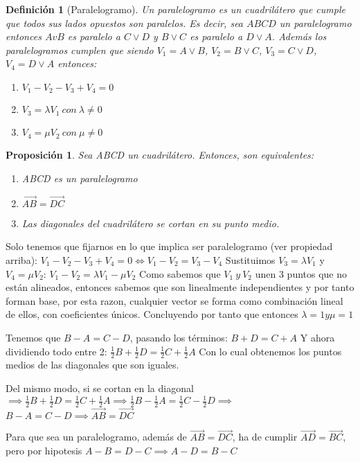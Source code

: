 \documentclass[11pt, a4paper, titlepage]{article}
\makeatletter
\renewenvironment{proof}[1][\proofname] {\vspace{-15pt}\par\pushQED{\qed}\normalfont\topsep6\p@\@plus6\p@\relax\trivlist\item[\hskip\labelsep\it#1\@addpunct{.}]\ignorespaces}{\popQED\endtrivlist\@endpefalse}
\theoremstyle{theorem-style}
\newtheorem*{nprop}{Proposición}
\theoremstyle{definition-style}
\newtheorem*{ndef}{Definición}
\theoremstyle{remark-style}
\theoremstyle{example-style}
\newenvironment{nlist}
{\begin{enumerate}
\renewcommand\labelenumi{(\emph{\roman{enumi})}}}
{\end{enumerate}}
\makeatother
\begin{document}
\begin{ndef}[Paralelogramo]
	Un paralelogramo es un cuadrilátero que cumple que todos sus lados opuestos son paralelos. Es decir, sea $ABCD$ un
	paralelogramo entonces $AvB$ es paralelo a $C \vee D$ y $B \vee C$ es paralelo a $D \vee A$. Además los paralelogramos cumplen que
	siendo $V_{1} = A \vee B$, $V_{2} = B \vee C$, $V_{3} = C\vee D$, $V_{4} = D \vee A$ entonces:
	\begin{nlist}
		\item $V_{1} - V_{2} - V_{3} + V_{4} = 0$
		\item $V_{3} = \lambda V_{1}\ con\ \lambda \neq 0$
		\item $V_{4} = \mu V_{2}\ con\ \mu \neq 0$
	\end{nlist}
\end{ndef}


\begin{nprop}
	Sea ABCD un cuadrilátero. Entonces, son equivalentes:
	\begin{nlist}
		\item ABCD es un paralelogramo
		\item $\vec{AB} = \vec{DC}$
		\item Las diagonales del cuadrilátero se cortan en su punto medio.
	\end{nlist}
\end{nprop}


\begin{proof}\hfill
	Solo tenemos que fijarnos en lo que implica ser paralelogramo (ver propiedad arriba):
	$V_{1} - V_{2} - V_{3} + V_{4} = 0 \Leftrightarrow V_{1} - V_{2} = V_{3} - V_{4} $
	Sustituimos $V_{3} = \lambda V_{1}$ y $V_{4} = \mu V_{2}$:
	$V_{1} - V_{2} = \lambda V_{1} - \mu V_{2}$
	Como sabemos que $V_{1}\ y\ V_{2}$ unen 3 puntos que no están alineados, entonces sabemos que son linealmente independientes y por
	tanto forman base, por esta razon, cualquier vector se forma como combinación lineal de ellos, con coeficientes únicos.
	Concluyendo por tanto que entonces $\lambda = 1 y \mu = 1$

	Tenemos que $B - A = C - D$, pasando los términos:
	$B + D = C + A$
	Y ahora dividiendo todo entre 2:
	$\frac{1}{2}B + \frac{1}{2}D = \frac{1}{2}C + \frac{1}{2}A$
	Con lo cual obtenemos los puntos medios de las diagonales que son iguales.

	 Del mismo modo, si se cortan en la diagonal 
	$\implies \frac{1}{2}B + \frac{1}{2}D = \frac{1}{2}C + \frac{1}{2}A \implies 
	\frac{1}{2}B - \frac{1}{2}A = \frac{1}{2}C - \frac{1}{2}D \implies $ $B - A = C - D \implies \vec{AB} = \vec{DC}$
	
	 Para que sea un paralelogramo, además de $\vec{AB} = \vec{DC}$, ha de cumplir $\vec{AD} = \vec{BC}$, pero por hipotesis $A - B = D - C \implies A - D = B - C$
	
\end{proof}
\end{document}
